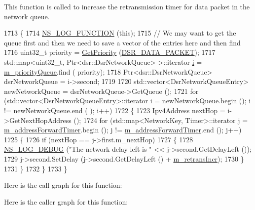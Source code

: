 This function is called to increase the retransmission timer for data packet in the network queue. 


\begin{DoxyCode}
1713 \{
1714   \hyperlink{log-macros-disabled_8h_a90b90d5bad1f39cb1b64923ea94c0761}{NS\_LOG\_FUNCTION} (\textcolor{keyword}{this});
1715   \textcolor{comment}{// We may want to get the queue first and then we need to save a vector of the entries here and then find}
1716   uint32\_t priority = \hyperlink{classns3_1_1dsr_1_1DsrRouting_a67d111b0188b6e2210d1b4782820f8e3}{GetPriority} (\hyperlink{namespacens3_1_1dsr_a7c80bcec67d78dc149a0e503014d07c5ad29c69f5a6ad5fbb5eec5524f553e315}{DSR\_DATA\_PACKET});
1717   std::map<uint32\_t, Ptr<dsr::DsrNetworkQueue> >::iterator \hyperlink{bernuolliDistribution_8m_a6f6ccfcf58b31cb6412107d9d5281426}{i} = \hyperlink{classns3_1_1dsr_1_1DsrRouting_a4606c3dfb1099afbfe1e7cd1d1c3c8ee}{m\_priorityQueue}.find (
      priority);
1718   Ptr<dsr::DsrNetworkQueue> dsrNetworkQueue = i->second;
1719 
1720   std::vector<DsrNetworkQueueEntry> newNetworkQueue = dsrNetworkQueue->GetQueue ();
1721   \textcolor{keywordflow}{for} (std::vector<DsrNetworkQueueEntry>::iterator i = newNetworkQueue.begin (); i != newNetworkQueue.end (
      ); i++)
1722     \{
1723       Ipv4Address nextHop = i->GetNextHopAddress ();
1724       \textcolor{keywordflow}{for} (std::map<NetworkKey, Timer>::iterator j = \hyperlink{classns3_1_1dsr_1_1DsrRouting_a4a35b13cdca413ab5bc0b1b3b7b78907}{m\_addressForwardTimer}.begin (); j
       != \hyperlink{classns3_1_1dsr_1_1DsrRouting_a4a35b13cdca413ab5bc0b1b3b7b78907}{m\_addressForwardTimer}.end (); j++)
1725         \{
1726           \textcolor{keywordflow}{if} (nextHop == j->first.m\_nextHop)
1727             \{
1728               \hyperlink{group__logging_ga413f1886406d49f59a6a0a89b77b4d0a}{NS\_LOG\_DEBUG} (\textcolor{stringliteral}{"The network delay left is "} << j->second.GetDelayLeft ());
1729               j->second.SetDelay (j->second.GetDelayLeft () + \hyperlink{classns3_1_1dsr_1_1DsrRouting_a49d8f2c59b9e8bcd6cb57cb302eac47b}{m\_retransIncr});
1730             \}
1731         \}
1732     \}
1733 \}
\end{DoxyCode}


Here is the call graph for this function\+:




Here is the caller graph for this function\+:


